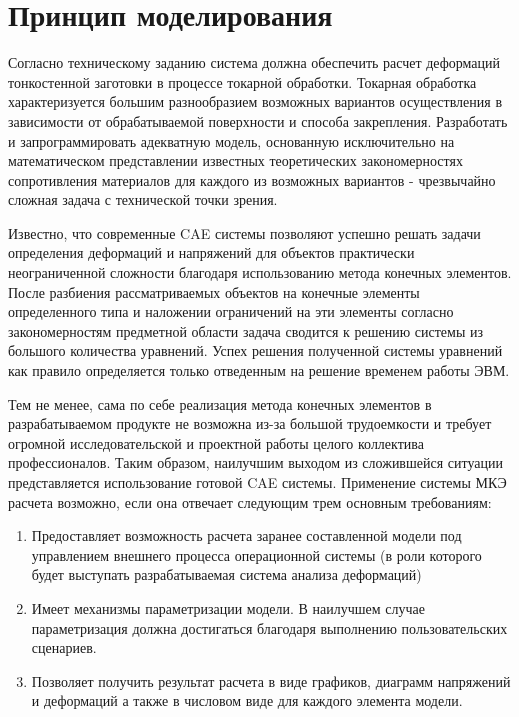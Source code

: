 \documentclass[14pt,oneside,final]{extreport}
\begin{document}
	\section{Принцип моделирования}
	Согласно техническому заданию система должна обеспечить расчет деформаций тонкостенной заготовки в процессе токарной обработки. Токарная обработка характеризуется большим разнообразием возможных вариантов осуществления в зависимости от обрабатываемой поверхности и способа закрепления. Разработать и запрограммировать адекватную модель, основанную исключительно на математическом представлении известных теоретических закономерностях сопротивления материалов для каждого из возможных вариантов - чрезвычайно сложная задача с технической точки зрения. 
	
	Известно, что современные CAE системы позволяют успешно решать задачи определения деформаций и напряжений для объектов практически неограниченной сложности благодаря использованию метода конечных элементов. После разбиения рассматриваемых объектов на конечные элементы определенного типа и наложении ограничений на эти элементы согласно закономерностям предметной области задача сводится к решению системы из большого количества уравнений. Успех решения полученной системы уравнений как правило определяется только отведенным на решение временем работы ЭВМ. 
	
	Тем не менее, сама по себе реализация метода конечных элементов в разрабатываемом продукте не возможна из-за большой трудоемкости и требует огромной исследовательской и проектной работы целого коллектива профессионалов. Таким образом, наилучшим выходом из сложившейся ситуации представляется использование готовой CAE системы. Применение системы МКЭ расчета возможно, если она отвечает следующим трем основным требованиям:
	\begin{enumerate}
	\item Предоставляет возможность расчета заранее составленной модели под управлением внешнего процесса операционной системы (в роли которого будет выступать разрабатываемая система анализа деформаций)
	\item Имеет механизмы параметризации модели. В наилучшем случае параметризация должна достигаться благодаря выполнению пользовательских сценариев.
	\item Позволяет получить результат расчета в виде графиков, диаграмм напряжений и деформаций а также в числовом виде для каждого элемента модели.
	\end{enumerate}
		
\end{document}
